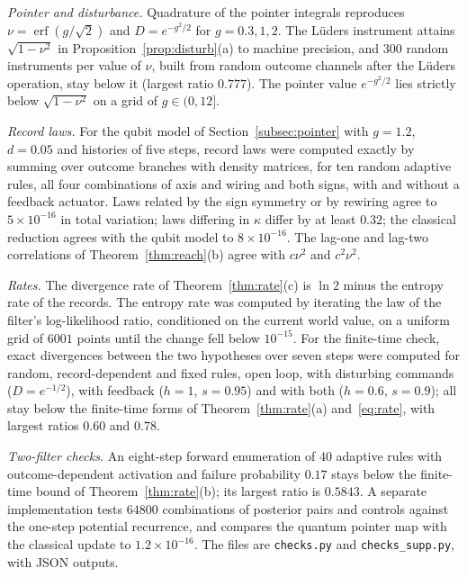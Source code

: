 \documentclass[11pt,a4paper]{article}
\begin{document}
\emph{Pointer and disturbance.} Quadrature of the pointer integrals reproduces $\nu=\operatorname{erf}(g/\sqrt2)$ and $D=e^{-g^2/2}$ for $g=0.3,1,2$. The L\"uders instrument attains $\sqrt{1-\nu^2}$ in Proposition~\ref{prop:disturb}(a) to machine precision, and $300$ random instruments per value of $\nu$, built from random outcome channels after the L\"uders operation, stay below it (largest ratio $0.777$). The pointer value $e^{-g^2/2}$ lies strictly below $\sqrt{1-\nu^2}$ on a grid of $g\in(0,12]$.

\emph{Record laws.} For the qubit model of Section~\ref{subsec:pointer} with $g=1.2$, $d=0.05$ and histories of five steps, record laws were computed exactly by summing over outcome branches with density matrices, for ten random adaptive rules, all four combinations of axis and wiring and both signs, with and without a feedback actuator. Laws related by the sign symmetry or by rewiring agree to $5\times10^{-16}$ in total variation; laws differing in $\kappa$ differ by at least $0.32$; the classical reduction agrees with the qubit model to $8\times10^{-16}$. The lag-one and lag-two correlations of Theorem~\ref{thm:reach}(b) agree with $c\nu^2$ and $c^2\nu^2$.

\emph{Rates.} The divergence rate of Theorem~\ref{thm:rate}(c) is $\ln2$ minus the entropy rate of the records. The entropy rate was computed by iterating the law of the filter's log-likelihood ratio, conditioned on the current world value, on a uniform grid of $6001$ points until the change fell below $10^{-15}$. For the finite-time check, exact divergences between the two hypotheses over seven steps were computed for random, record-dependent and fixed rules, open loop, with disturbing commands ($D=e^{-1/2}$), with feedback ($h=1$, $s=0.95$) and with both ($h=0.6$, $s=0.9$); all stay below the finite-time forms of Theorem~\ref{thm:rate}(a) and~\eqref{eq:rate}, with largest ratios $0.60$ and $0.78$.

\emph{Two-filter checks.} An eight-step forward enumeration of $40$ adaptive rules with outcome-dependent activation and failure probability $0.17$ stays below the finite-time bound of Theorem~\ref{thm:rate}(b); its largest ratio is $0.5843$. A separate implementation tests $64800$ combinations of posterior pairs and controls against the one-step potential recurrence, and compares the quantum pointer map with the classical update to $1.2\times10^{-16}$. The files are \texttt{checks.py} and \texttt{checks\_supp.py}, with JSON outputs.\par
\end{document}
